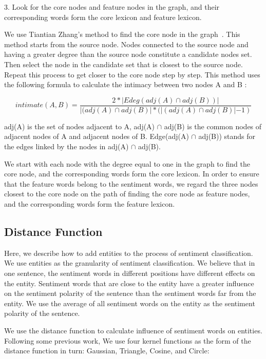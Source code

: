 \documentclass[runningheads]{llncs}
\begin{document}
3. Look for the core nodes and feature nodes in the graph, and their corresponding words form the core lexicon and feature lexicon.

We use Tiantian Zhang's method to find the core node in the graph~\cite{Zhang2012corenodes}. This method starts from the source node. Nodes connected to the source node and having a greater degree than the source node constitute a candidate nodes set. Then select the node in the candidate set that is closest to the source node. Repeat this process to get closer to the core node step by step. This method uses the following formula to calculate the intimacy between two nodes A and B :

\begin{equation}
    intimate(A,B) = \frac{2*|Edeg(adj(A)\cap adj(B))|}{|(adj(A)\cap adj(B)|*(|(adj(A)\cap adj(B)|-1)}
\end{equation}

adj(A) is the set of nodes adjacent to A, adj(A) $\cap$ adj(B) is the common nodes of adjacent nodes of A and adjacent nodes of B. Edge(adj(A) $\cap$ adj(B)) stands for the edges linked by the nodes in adj(A) $\cap$ adj(B).

We start with each node with the degree equal to one in the graph to find the core node, and the corresponding words form the core lexicon. In order to ensure that the feature words belong to the sentiment words, we regard the three nodes closest to the core node on the path of finding the core node as feature nodes, and the corresponding words form the feature lexicon.

\subsection{Distance Function}
Here, we describe how to add entities to the process of sentiment classification. We use entities as the granularity of sentiment classification. We believe that in one sentence, the sentiment words in different positions have different effects on the entity. Sentiment words that are close to the entity have a greater influence on the sentiment polarity of the sentence than the sentiment words far from the entity. We use the average of all sentiment words on the entity as the sentiment polarity of the sentence.

We use the distance function to calculate influence of sentiment words on entities. Following some previous work, We use four kernel functions as the form of the distance function in turn: Gaussian, Triangle, Cosine, and Circle:
\end{document}
